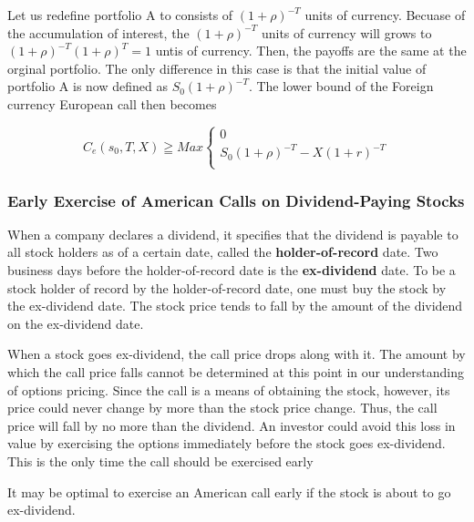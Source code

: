 \documentclass{book}
\theoremstyle{definition}
\theoremstyle{remark}
\begin{document}
            Let us redefine portfolio A to consists of $(1+ \rho)^{-T}$ units of currency. Becuase of the accumulation of interest, the $(1 + \rho)^{-T}$ units of currency will grows to $(1+ \rho)^{-T}(1+ \rho)^{T} = 1$ untis of currency. Then, the payoffs are the same at the orginal portfolio. The only difference in this case is that the initial  value of portfolio A is now defined as $S_0(1+ \rho)^{-T}$. The lower bound of the Foreign currency European call then becomes

                \begin{equation}
                    C_e(s_0,T,X) \geqq Max
                         \begin{cases}
                            0 \\
                            S_0(1+ \rho)^{-T} - X(1 + r)^{-T} \\
                        \end{cases}
                \end{equation}
            
        \subsubsection{Early Exercise of American Calls on Dividend-Paying Stocks}
            When a company declares a dividend, it specifies that the dividend is payable to all stock holders as of a certain date, called the \textbf{holder-of-record} date. Two business days before the holder-of-record date is the \textbf{ex-dividend} date. To be a stock holder of record by the holder-of-record date, one must buy the stock by the ex-dividend date. The stock price tends to fall by the amount of the dividend on the ex-dividend date. 
            
            When a stock goes ex-dividend, the call price drops along with it. The amount by which the call price falls cannot be determined at this point in our understanding of options pricing. Since the call is a means of obtaining the stock, however, its price could never change by more than the stock price change. Thus, the call price will fall by no more than the dividend. An investor could avoid this loss in value by exercising the options immediately before the stock goes ex-dividend. This is the only time the call should be exercised early
            
        \begin{tcolorbox}[colback=blue!5!white,colframe=blue!75!black, title=Sticky Note]
            It may be optimal to exercise an American call early if the stock is about to go ex-dividend.
        \end{tcolorbox}             
        
\end{document}
